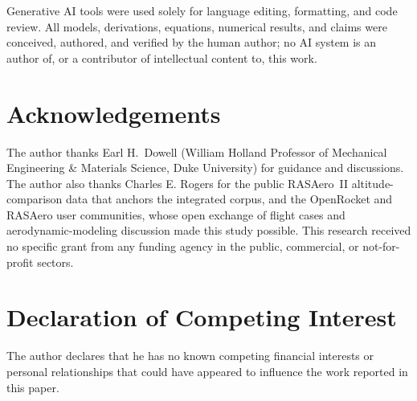 Generative AI tools were used solely for language editing, formatting, and code review.
All models, derivations, equations, numerical results, and claims were conceived,
authored, and verified by the human author; no AI system is an author of, or a
contributor of intellectual content to, this work.

\section*{Acknowledgements}

The author thanks Earl H.~Dowell (William Holland Professor of Mechanical
Engineering \& Materials Science, Duke University) for guidance and discussions.
The author also thanks Charles E. Rogers for the public RASAero~II altitude-comparison
data \cite{rogers2015} that anchors the integrated corpus, and the OpenRocket and
RASAero user communities, whose open exchange of flight cases and aerodynamic-modeling
discussion made this study possible. This research received no specific grant from any
funding agency in the public, commercial, or not-for-profit sectors.

\section*{Declaration of Competing Interest}

The author declares that he has no known competing financial interests or personal
relationships that could have appeared to influence the work reported in this paper.
